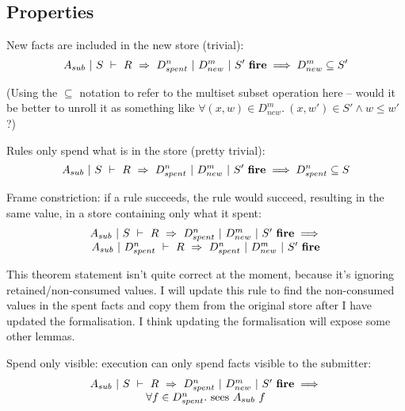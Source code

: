 


\subsection{Properties}


\begin{lemma}
New facts are included in the new store (trivial):
$$
A_{sub}~|~S~\vdash~R~\Rightarrow~D_{spent}^n~|~D_{new}^m~|~S'~\textbf{fire}
\implies
D_{new}^m \subseteq S'
$$
\end{lemma}
(Using the $\subseteq$ notation to refer to the multiset subset operation here -- would it be better to unroll it as something like $\forall (x,w) \in D_{new}^m.\ (x,w') \in S' \wedge w \le w'$ ?)

\begin{lemma}
Rules only spend what is in the store (pretty trivial):
$$
A_{sub}~|~S~\vdash~R~\Rightarrow~D_{spent}^n~|~D_{new}^m~|~S'~\textbf{fire}
\implies
D_{spent}^n \subseteq S
$$
\end{lemma}

\begin{theorem}
Frame constriction: if a rule succeeds, the rule would succeed, resulting in the same value, in a store containing only what it spent:
$$
\begin{array}{c}
A_{sub}~|~S~\vdash~R~\Rightarrow~D_{spent}^n~|~D_{new}^m~|~S'~\textbf{fire}
\implies \\
A_{sub}~|~D_{spent}^n~\vdash~R~\Rightarrow~D_{spent}^n~|~D_{new}^m~|~S'~\textbf{fire}
\end{array}
$$
\end{theorem}
This theorem statement isn't quite correct at the moment, because it's ignoring retained/non-consumed values. I will update this rule to find the non-consumed values in the spent facts and copy them from the original store after I have updated the formalisation. I think updating the formalisation will expose some other lemmas.

\begin{theorem}
Spend only visible: execution can only spend facts visible to the submitter:
$$
\begin{array}{c}
A_{sub}~|~S~\vdash~R~\Rightarrow~D_{spent}^n~|~D_{new}^m~|~S'~\textbf{fire}
\implies \\
\forall f \in D_{spent}^n.\ \textrm{sees}~ A_{sub}~ f
\end{array}
$$
\end{theorem}

